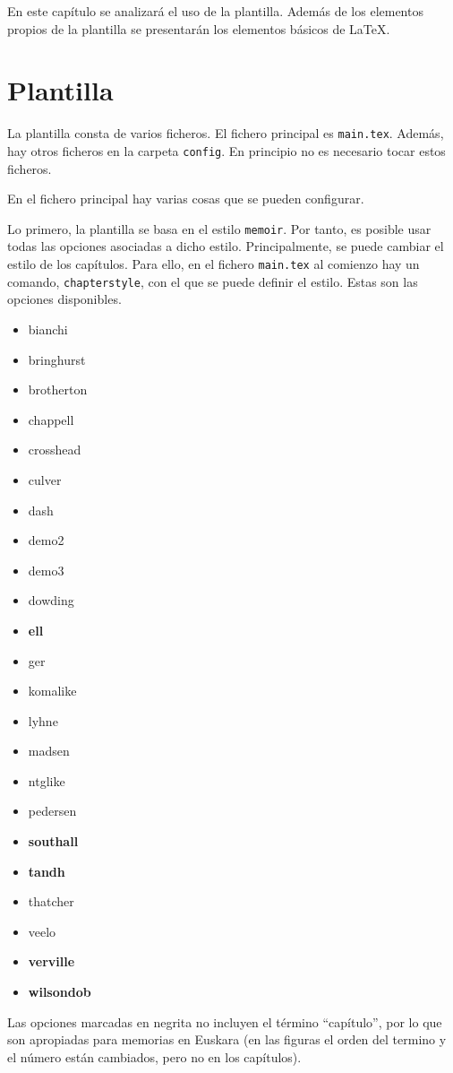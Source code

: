 En este capítulo se analizará el uso de la plantilla. Además de los elementos propios de la plantilla se presentarán los elementos básicos de \LaTeX.

\section{Plantilla}

La plantilla consta de varios ficheros. El fichero principal es \texttt{main.tex}. Además, hay otros ficheros en la carpeta \texttt{config}. En principio no es necesario tocar estos ficheros.

En el fichero principal hay varias cosas que se pueden configurar.

Lo primero, la plantilla se basa en el estilo \texttt{memoir}. Por tanto, es posible usar todas las opciones asociadas a dicho estilo. Principalmente, se puede cambiar el estilo de los capítulos. Para ello, en el fichero \texttt{main.tex} al comienzo hay un comando, \texttt{chapterstyle}, con el que se puede definir el estilo. Estas son las opciones disponibles.
\begin{itemize}
	\item bianchi
	\item bringhurst
	\item brotherton
	\item chappell
	\item crosshead
	\item culver
	\item dash
	\item demo2
	\item demo3
	\item dowding
	\item \textbf{ell}
	\item ger
	\item komalike
	\item lyhne
	\item madsen
	\item ntglike
	\item pedersen
	\item \textbf{southall}
	\item \textbf{tandh}
	\item thatcher
	\item veelo
	\item \textbf{verville}
	\item \textbf{wilsondob}
\end{itemize}

Las opciones marcadas en negrita no incluyen el término ``capítulo'', por lo que son apropiadas para memorias en Euskara (en las figuras el orden del termino y el número están cambiados, pero no en los capítulos).

